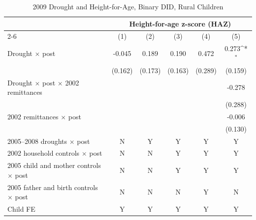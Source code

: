 \documentclass[12pt]{article}
\def\sym#1{\ifmmode^{#1}\else\(^{#1}\)\fi}
\begin{document}
\begin{longtable}{l*{5}{c}}
\caption{2009 Drought and Height-for-Age, Binary DID, Rural Children}\\
\toprule
 & \multicolumn{5}{c}{Height-for-age z-score (HAZ)}\\
\cmidrule(lr){2-6}
            &\multicolumn{1}{c}{(1)}         &\multicolumn{1}{c}{(2)}         &\multicolumn{1}{c}{(3)}         &\multicolumn{1}{c}{(4)}         &\multicolumn{1}{c}{(5)}         \\
\midrule
Drought \ensuremath{\times} post&      -0.045         &       0.189         &       0.190         &       0.472         &       0.273\sym{*}  \\
            &     (0.162)         &     (0.173)         &     (0.163)         &     (0.289)         &     (0.159)         \\
Drought \ensuremath{\times} post \ensuremath{\times} 2002 remittances&                     &                     &                     &                     &      -0.278         \\
            &                     &                     &                     &                     &     (0.288)         \\
2002 remittances \ensuremath{\times} post&                     &                     &                     &                     &      -0.006         \\
            &                     &                     &                     &                     &     (0.130)         \\
\midrule
2005--2008 droughts \ensuremath{\times} post&           N         &           Y         &           Y         &           Y         &           Y         \\
2002 household controls \ensuremath{\times} post&           N         &           N         &           Y         &           Y         &           Y         \\
2005 child and mother controls \ensuremath{\times} post&           N         &           N         &           Y         &           Y         &           Y         \\
2005 father and birth controls \ensuremath{\times} post&           N         &           N         &           N         &           Y         &           N         \\
Child FE    &           Y         &           Y         &           Y         &           Y         &           Y         \\

\end{longtable}
\end{document}
